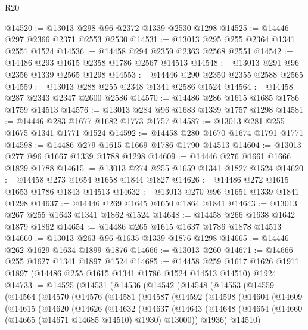 \begin{lexlean}{R20}
\begin{coremodule}
@14520 := @13013 @298 @96 @2372 @1339 @2530 @1298
@14525 := @14446 @297 @2366 @2371 @2553 @2530
@14531 := @13013 @295 @255 @2364 @1341 @2551 @1524
@14536 := @14458 @294 @2359 @2363 @2568 @2551
@14542 := @14486 @293 @1615 @2358 @1786 @2567 @14513
@14548 := @13013 @291 @96 @2356 @1339 @2565 @1298
@14553 := @14446 @290 @2350 @2355 @2588 @2565
@14559 := @13013 @288 @255 @2348 @1341 @2586 @1524
@14564 := @14458 @287 @2343 @2347 @2600 @2586
@14570 := @14486 @286 @1615 @1685 @1786 @1759 @14513
@14576 := @13013 @284 @96 @1683 @1339 @1757 @1298
@14581 := @14446 @283 @1677 @1682 @1773 @1757
@14587 := @13013 @281 @255 @1675 @1341 @1771 @1524
@14592 := @14458 @280 @1670 @1674 @1791 @1771
@14598 := @14486 @279 @1615 @1669 @1786 @1790 @14513
@14604 := @13013 @277 @96 @1667 @1339 @1788 @1298
@14609 := @14446 @276 @1661 @1666 @1829 @1788
@14615 := @13013 @274 @255 @1659 @1341 @1827 @1524
@14620 := @14458 @273 @1654 @1658 @1844 @1827
@14626 := @14486 @272 @1615 @1653 @1786 @1843 @14513
@14632 := @13013 @270 @96 @1651 @1339 @1841 @1298
@14637 := @14446 @269 @1645 @1650 @1864 @1841
@14643 := @13013 @267 @255 @1643 @1341 @1862 @1524
@14648 := @14458 @266 @1638 @1642 @1879 @1862
@14654 := @14486 @265 @1615 @1637 @1786 @1878 @14513
@14660 := @13013 @263 @96 @1635 @1339 @1876 @1298
@14665 := @14446 @262 @1629 @1634 @1899 @1876
@14666 := @13013 @260
@14671 := @14666 @255 @1627 @1341 @1897 @1524
@14685 := @14458
    @259
    @1617
    @1626
    @1911
    @1897
    (@14486 @255 @1615 @1341 @1786 @1524 @14513 @14510)
    @1924
@14733 := @14525
    (@14531
      (@14536
        (@14542
          (@14548
            (@14553
              (@14559
                (@14564
                  (@14570
                    (@14576
                      (@14581
                        (@14587
                          (@14592
                            (@14598
                              (@14604
                                (@14609
                                  (@14615
                                    (@14620
                                      (@14626
                                        (@14632
                                          (@14637
                                            (@14643
                                              (@14648
                                                (@14654
                                                  (@14660
                                                    (@14665 (@14671 @14685 @14510) @1930)
                                                    @13000))
                                                @1936)
                                              @14510)

\end{coremodule}
\end{lexlean}
